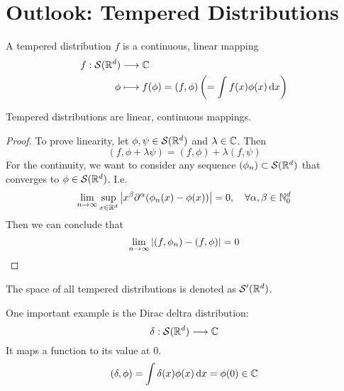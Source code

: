 \documentclass[../../script.tex]{subfiles}
\begin{document}
\section{Outlook: Tempered Distributions}

\begin{defi}
    A tempered distribution $f$ is a continuous, linear mapping
    \begin{align*}
        f: \mathcal{S}(\realn^d) &\longrightarrow \cmpln \\
        \phi &\longmapsto f(\phi) = (f, \phi) \left( = \int f(x) \phi(x) \dd{x} \right)
    \end{align*}
\end{defi}

\begin{thm}
    Tempered distributions are linear, continuous mappings.
\end{thm}
\begin{proof}
    To prove linearity, let $\phi, \psi \in \mathcal{S}(\realn^d)$ and $\lambda \in \cmpln$. Then 
    \begin{equation}
        (f, \phi + \lambda\psi) = (f, \phi) + \lambda(f, \psi)
    \end{equation}
    For the continuity, we want to consider any sequence $\anyseqdef[\phi]{\mathcal{S}(\realn^d)}$ that converges to $\phi \in \mathcal{S}(\realn^d)$. I.e.
    \begin{equation}
        \lim_{n \rightarrow \infty} \sup_{x \in \realn^d} \abs{x^{\beta} \partial^{\alpha} (\phi_n(x) - \phi(x))} = 0, \quad \forall \alpha, \beta \in \natn_0^d
    \end{equation}
    Then we can conclude that 
    \begin{equation}
        \lim_{n \rightarrow \infty} \abs{(f, \phi_n) - (f, \phi)} = 0
    \end{equation}
\end{proof}

\begin{rem}
    The space of all tempered distributions is denoted as $\mathcal{S}'(\realn^d)$.
\end{rem}

\begin{eg}
    One important example is the Dirac deltra distribution:
    \[
        \delta: \mathcal{S}(\realn^d) \longrightarrow \cmpln
    \]
    It maps a function to its value at $0$.
    \[
        (\delta, \phi) = \int \delta(x) \phi(x) \dd{x} = \phi(0) \in \cmpln
    \]
\end{eg}
\end{document}
